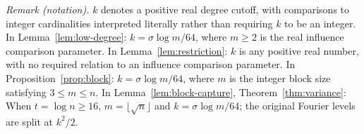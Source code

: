 \noindent\textit{Remark (notation).} $k$ denotes a positive real degree cutoff, with comparisons to integer cardinalities interpreted literally rather than requiring $k$ to be an integer. In Lemma~\ref{lem:low-degree}: $k=\sigma\log m/64$, where $m\ge2$ is the real influence comparison parameter. In Lemma~\ref{lem:restriction}: $k$ is any positive real number, with no required relation to an influence comparison parameter. In Proposition~\ref{prop:block}: $k=\sigma\log m/64$, where $m$ is the integer block size satisfying $3\le m\le n$. In Lemma~\ref{lem:block-capture}, Theorem~\ref{thm:variance}: When $t=\log n\ge16$, $m=\lfloor\sqrt n\rfloor$ and $k=\sigma\log m/64$; the original Fourier levels are split at $k^2/2$.

